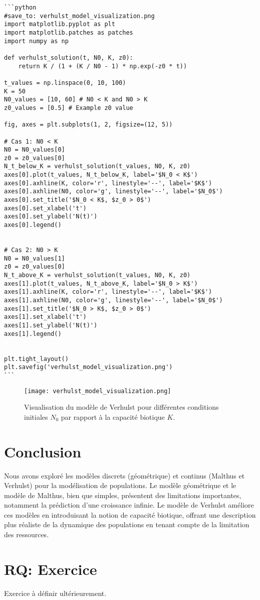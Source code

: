 \documentclass{article}
\begin{document}
\begin{verbatim}
```python
#save_to: verhulst_model_visualization.png
import matplotlib.pyplot as plt
import matplotlib.patches as patches
import numpy as np

def verhulst_solution(t, N0, K, z0):
    return K / (1 + (K / N0 - 1) * np.exp(-z0 * t))

t_values = np.linspace(0, 10, 100)
K = 50
N0_values = [10, 60] # N0 < K and N0 > K
z0_values = [0.5] # Example z0 value

fig, axes = plt.subplots(1, 2, figsize=(12, 5))

# Cas 1: N0 < K
N0 = N0_values[0]
z0 = z0_values[0]
N_t_below_K = verhulst_solution(t_values, N0, K, z0)
axes[0].plot(t_values, N_t_below_K, label='$N_0 < K$')
axes[0].axhline(K, color='r', linestyle='--', label='$K$')
axes[0].axhline(N0, color='g', linestyle='--', label='$N_0$')
axes[0].set_title('$N_0 < K$, $z_0 > 0$')
axes[0].set_xlabel('t')
axes[0].set_ylabel('N(t)')
axes[0].legend()


# Cas 2: N0 > K
N0 = N0_values[1]
z0 = z0_values[0]
N_t_above_K = verhulst_solution(t_values, N0, K, z0)
axes[1].plot(t_values, N_t_above_K, label='$N_0 > K$')
axes[1].axhline(K, color='r', linestyle='--', label='$K$')
axes[1].axhline(N0, color='g', linestyle='--', label='$N_0$')
axes[1].set_title('$N_0 > K$, $z_0 > 0$')
axes[1].set_xlabel('t')
axes[1].set_ylabel('N(t)')
axes[1].legend()


plt.tight_layout()
plt.savefig('verhulst_model_visualization.png')
```
\end{verbatim}

\begin{figure}[h]
    \centering
    \texttt{[image: verhulst\_model\_visualization.png]}
    \caption{Visualisation du modèle de Verhulst pour différentes conditions initiales $N_0$ par rapport à la capacité biotique $K$.}
    \label{fig:verhulst_model_visualization}
\end{figure}


\section{Conclusion}

Nous avons exploré les modèles discrets (géométrique) et continus (Malthus et Verhulst) pour la modélisation de populations. Le modèle géométrique et le modèle de Malthus, bien que simples, présentent des limitations importantes, notamment la prédiction d'une croissance infinie. Le modèle de Verhulst améliore ces modèles en introduisant la notion de capacité biotique, offrant une description plus réaliste de la dynamique des populations en tenant compte de la limitation des ressources.

\section*{RQ: Exercice}
Exercice à définir ultérieurement.
\end{document}
